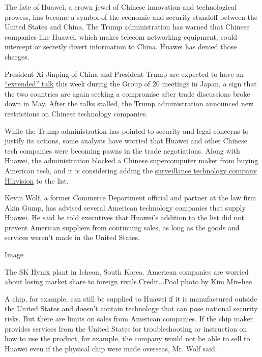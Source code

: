 The fate of Huawei, a crown jewel of Chinese innovation and
technological prowess, has become a symbol of the economic and security
standoff between the United States and China. The Trump administration
has warned that Chinese companies like Huawei, which makes telecom
networking equipment, could intercept or secretly divert information to
China. Huawei has denied those charges.

President Xi Jinping of China and President Trump are expected to have
an
\href{https://www.nytimes.com/2019/06/18/us/politics/trump-china-meeting-trade.html?action=click\&module=RelatedCoverage\&pgtype=Article\&region=Footer}{``extended''
talk} this week during the Group of 20 meetings in Japan, a sign that
the two countries are again seeking a compromise after trade discussions
broke down in May. After the talks stalled, the Trump administration
announced new restrictions on Chinese technology companies.

While the Trump administration has pointed to security and legal
concerns to justify its actions, some analysts have worried that Huawei
and other Chinese tech companies were becoming pawns in the trade
negotiations. Along with Huawei, the administration blocked a Chinese
\href{https://www.nytimes.com/2019/06/21/us/politics/us-china-trade-blacklist.html}{supercomputer
maker} from buying American tech, and it is considering adding the
\href{https://www.nytimes.com/2019/05/21/us/politics/hikvision-trump.html?module=inline}{surveillance
technology company Hikvision} to the list.

Kevin Wolf, a former Commerce Department official and partner at the law
firm Akin Gump, has advised several American technology companies that
supply Huawei. He said he told executives that Huawei's addition to the
list did not prevent American suppliers from continuing sales, as long
as the goods and services weren't made in the United States.

Image

The SK Hynix plant in Icheon, South Korea. American companies are
worried about losing market share to foreign rivals.Credit...Pool photo
by Kim Min-hee

A chip, for example, can still be supplied to Huawei if it is
manufactured outside the United States and doesn't contain technology
that can pose national security risks. But there are limits on sales
from American companies. If the chip maker provides services from the
United States for troubleshooting or instruction on how to use the
product, for example, the company would not be able to sell to Huawei
even if the physical chip were made overseas, Mr. Wolf said.

